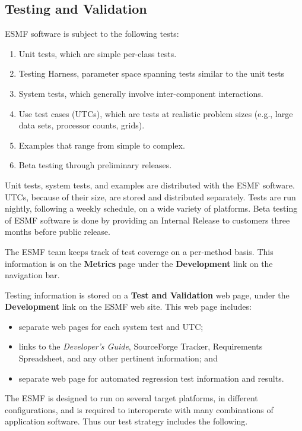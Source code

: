 
\subsection{Testing and Validation}
\label{sec:testing}

ESMF software is subject to the following tests:
\begin{enumerate}
\item Unit tests, which are simple per-class tests.
\item Testing Harness, parameter space spanning tests similar to the unit tests
\item System tests, which generally involve inter-component interactions.
\item Use test cases (UTCs), which are tests at realistic problem
sizes (e.g., large data sets, processor counts, grids).
\item Examples that range from simple to complex.
\item Beta testing through preliminary releases.
\end{enumerate}
Unit tests, system tests, and examples are distributed with the
ESMF software.  UTCs, because of their size, are 
stored and distributed separately.  Tests are run nightly,
following a weekly schedule, on a wide variety of platforms.  
Beta testing of ESMF software is done by providing an Internal Release
to customers three months before public release.  

The ESMF team keeps track of test coverage on a per-method basis.
This information is on the {\bf Metrics} page under the {\bf Development}
link on the navigation bar.

Testing information is stored on a {\bf Test and Validation} web page,
under the {\bf Development} link on the ESMF 
web site.  This web page includes:
\begin{itemize}
\item separate web pages for each system test and UTC;
\item links to the {\it Developer's Guide}, SourceForge Tracker, Requirements 
Spreadsheet, and any other pertinent information; and
\item separate web page for automated regression test information and results.
\end{itemize}

The ESMF is designed to run on several target platforms, in different 
configurations, and is required to interoperate with many combinations 
of application software. Thus our test strategy includes the following.

